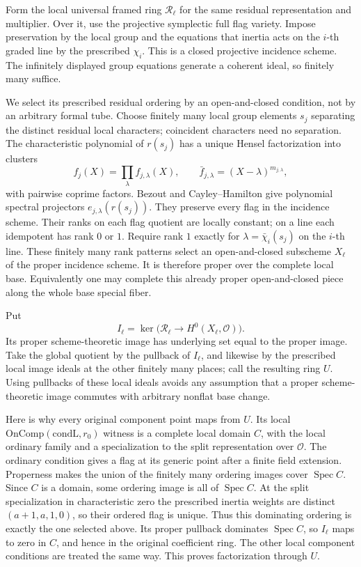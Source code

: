 Form the local universal framed ring \(\mathcal R_\ell\)
for the same residual representation and multiplier.
Over it, use the projective symplectic full flag variety.
Impose preservation by the local group and the equations
that inertia acts on the \(i\)-th graded line by the
prescribed \(\chi_i\).
This is a closed projective incidence scheme.
The infinitely displayed group equations generate a
coherent ideal, so finitely many suffice.

We select its prescribed residual ordering by an
open-and-closed condition, not by an arbitrary formal tube.
Choose finitely many local group elements \(s_j\) separating
the distinct residual local characters; coincident characters
need no separation.
The characteristic polynomial of \(r(s_j)\) has a unique
Hensel factorization into clusters
\[
             f_j(X)=\prod_\lambda f_{j,\lambda}(X),
 \qquad
             \bar f_{j,\lambda}=(X-\lambda)^{m_{j,\lambda}},
\]
with pairwise coprime factors.
Bezout and Cayley--Hamilton give polynomial spectral
projectors \(e_{j,\lambda}(r(s_j))\).
They preserve every flag in the incidence scheme.
Their ranks on each flag quotient are locally constant;
on a line each idempotent has rank \(0\) or \(1\).
Require rank \(1\) exactly for
\(\lambda=\bar\chi_i(s_j)\) on the \(i\)-th line.
These finitely many rank patterns select an open-and-closed
subscheme \(X_\ell\) of the proper incidence scheme.
It is therefore proper over the complete local base.
Equivalently one may complete this already proper
open-and-closed piece along the whole base special fiber.

Put
\[
 I_\ell=\ker\bigl(\mathcal R_\ell
                         \longrightarrow H^0(X_\ell,\mathcal O)\bigr).
\]
Its proper scheme-theoretic image has underlying set equal
to the proper image.
Take the global quotient by the pullback of \(I_\ell\),
and likewise by the prescribed local image ideals at the
other finitely many places; call the resulting ring \(U\).
Using pullbacks of these local ideals avoids any assumption
that a proper scheme-theoretic image commutes with arbitrary
nonflat base change.

Here is why every original component point maps from \(U\).
Its local \(\mathrm{OnComp}(\mathrm{condL},r_0)\) witness
is a complete local domain \(C\), with the local ordinary
family and a specialization to the split representation
over \(\mathcal O\).
The ordinary condition gives a flag at its generic point
after a finite field extension.
Properness makes the union of the finitely many ordering
images cover \(\operatorname{Spec}C\).
Since \(C\) is a domain, some ordering image is all of
\(\operatorname{Spec}C\).
At the split specialization in characteristic zero the
prescribed inertia weights are distinct
\((a+1,a,1,0)\), so their ordered flag is unique.
Thus this dominating ordering is exactly the one selected
above. Its proper pullback dominates \(\operatorname{Spec}C\),
so \(I_\ell\) maps to zero in \(C\), and hence in the
original coefficient ring.
The other local component conditions are treated the same
way. This proves factorization through \(U\).

